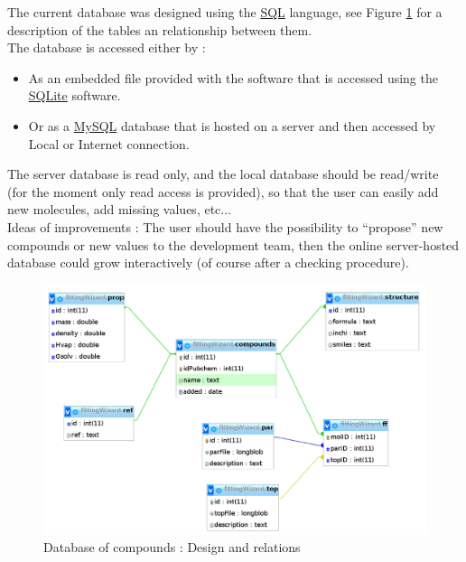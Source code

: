 \documentclass[12pt,a4paper]{article}
\begin{document}
The current database was designed using the \href{http://en.wikipedia.org/wiki/SQL}{SQL} 
language, see Figure \ref{dbFig} for a description of the tables an relationship between them.\\

The database is accessed either by : 
\begin{itemize}
\item As an embedded file provided with the software that is accessed using the 
\href{http://www.sqlite.org/}{SQLite} software.
\item Or as a \href{http://www.mysql.com/}{MySQL} database that is hosted on a server and then 
accessed by Local or Internet connection.
\end{itemize}

The server database is read only, and the local database should be read/write (for the moment only 
read access is provided), so that the user can easily add new molecules, add missing values, 
etc...\\

Ideas of improvements :
The user should have the possibility to ``propose'' new compounds or new values to the 
development team, then the online server-hosted database could grow interactively (of course after 
a checking procedure).

\begin{figure}[h!]
\centering
\includegraphics[width=0.9\linewidth]{pics/db}
\caption{Database of compounds : Design and relations}
\label{dbFig}
\end{figure}

\end{document}
